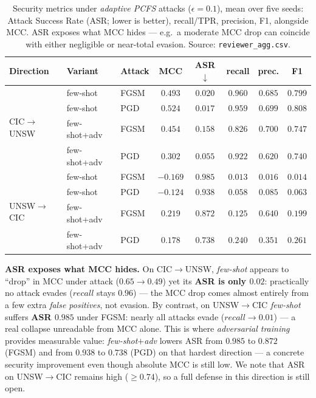 \documentclass[preprint,12pt,authoryear]{elsarticle}
\begin{document}
\begin{table}[h]
\centering
\caption{Security metrics under \emph{adaptive PCFS} attacks ($\epsilon{=}0.1$), mean
over five seeds: Attack Success Rate (ASR; lower is better), recall/TPR, precision,
F1, alongside MCC. ASR exposes what MCC hides --- e.g.\ a moderate MCC drop can
coincide with either negligible or near-total evasion. Source:
\texttt{reviewer\_agg.csv}.}
\label{tab:advmetrics}
\small
\begin{tabular}{lllccccc}
\toprule
Direction & Variant & Attack & MCC & ASR$\downarrow$ & recall & prec. & F1 \\
\midrule
\multirow{4}{*}{CIC$\rightarrow$UNSW}
 & few-shot     & FGSM & $0.493$ & $\mathbf{0.020}$ & $0.960$ & $0.685$ & $0.799$ \\
 & few-shot     & PGD  & $0.524$ & $\mathbf{0.017}$ & $0.959$ & $0.699$ & $0.808$ \\
 & few-shot+adv & FGSM & $0.454$ & $0.158$ & $0.826$ & $0.700$ & $0.747$ \\
 & few-shot+adv & PGD  & $0.302$ & $0.055$ & $0.922$ & $0.620$ & $0.740$ \\
\midrule
\multirow{4}{*}{UNSW$\rightarrow$CIC}
 & few-shot     & FGSM & $-0.169$ & $0.985$ & $0.013$ & $0.016$ & $0.014$ \\
 & few-shot     & PGD  & $-0.124$ & $0.938$ & $0.058$ & $0.085$ & $0.063$ \\
 & few-shot+adv & FGSM & $0.219$ & $\mathbf{0.872}$ & $0.125$ & $0.640$ & $0.199$ \\
 & few-shot+adv & PGD  & $0.178$ & $\mathbf{0.738}$ & $0.240$ & $0.351$ & $0.261$ \\
\bottomrule
\end{tabular}
\end{table}

\noindent\textbf{ASR exposes what MCC hides.} On CIC$\rightarrow$UNSW,
\emph{few-shot} appears to ``drop'' in MCC under attack ($0.65\rightarrow0.49$) yet
its \textbf{ASR is only $0.02$}: practically no attack evades ($recall$ stays
$0.96$) --- the MCC drop comes almost entirely from a few extra \emph{false
positives}, not evasion. By contrast, on UNSW$\rightarrow$CIC \emph{few-shot}
suffers \textbf{ASR $0.985$} under FGSM: nearly all attacks evade
($recall\rightarrow0.01$) --- a real collapse unreadable from MCC alone. This is
where \emph{adversarial training} provides measurable value: \emph{few-shot$+$adv}
lowers ASR from $0.985$ to $0.872$ (FGSM) and from $0.938$ to $0.738$ (PGD) on that
hardest direction --- a concrete security improvement even though absolute MCC is
still low. We note that ASR on UNSW$\rightarrow$CIC remains high ($\ge0.74$), so a
full defense in this direction is still open.
\end{document}
